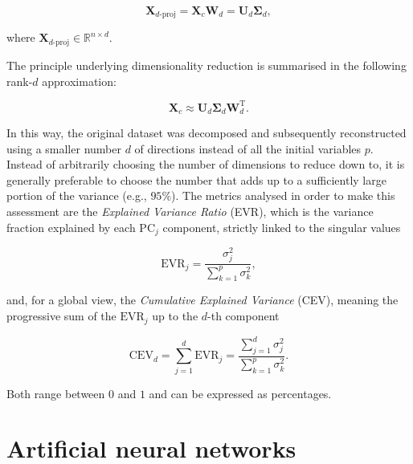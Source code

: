 \begin{equation}
    \mathbf{X}_{d\text{-proj}} =
    \mathbf{X}_c \mathbf{W}_d =
    \mathbf{U}_d\boldsymbol{\Sigma}_d,
    \label{eq:pca_scores_svd}
\end{equation}

where \(\mathbf{X}_{d\text{-proj}} \in \mathbb{R}^{n \times d}\). 

The principle underlying dimensionality reduction is summarised in the following rank-\(d\) approximation:

\begin{equation}
    \mathbf{X}_c \approx
    \mathbf{U}_d\boldsymbol{\Sigma}_d\mathbf{W}_d^{\mathrm{T}}.
    \label{eq:pca_low_rank}
\end{equation}

In this way, the original dataset was decomposed and subsequently reconstructed using a smaller number \(d\) of directions instead of all the initial variables \(p\). 
Instead of arbitrarily choosing the number of dimensions to reduce down to, it is
generally preferable to choose the number that adds up to a sufficiently
large portion of the variance (e.g., \(95\%\)).
The metrics analysed in order to make this assessment are the \textit{Explained Variance Ratio} (EVR), which is the variance fraction explained by each \(\mathrm{PC}_j\) component, strictly linked to the singular values

\begin{equation}
    \mathrm{EVR}_j =
    \frac{\sigma_j^2}{\sum_{k=1}^{p}\sigma_k^2},
    \label{eq:pca_explained_variance_ratio_svd}
\end{equation}

and, for a global view, the \textit{Cumulative Explained Variance} (CEV), meaning the progressive sum of the \(\mathrm{EVR}_j\) up to the \(d\)-th component

\begin{equation}
    \mathrm{CEV}_d =
    \sum_{j=1}^{d}\mathrm{EVR}_j =
    \frac{\sum_{j=1}^{d}\sigma_j^2}{\sum_{k=1}^{p}\sigma_k^2}.
    \label{eq:pca_cumulative_explained_variance_svd}
\end{equation}

Both range between \(0\) and \(1\) and can be expressed as percentages. 




\section{Artificial neural networks}
\label{sec:ann_fundamentals}

